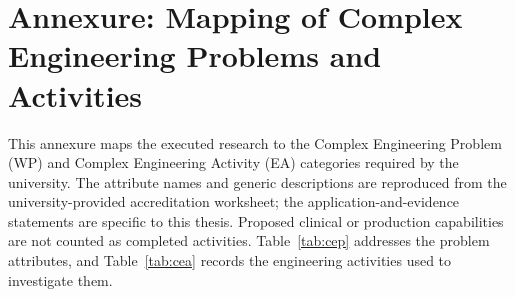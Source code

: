 \clearpage
\chapter*{Annexure: Mapping of Complex Engineering Problems and Activities}

This annexure maps the executed research to the Complex Engineering Problem (WP) and Complex Engineering Activity (EA) categories required by the university. The attribute names and generic descriptions are reproduced from the university-provided accreditation worksheet; the application-and-evidence statements are specific to this thesis. Proposed clinical or production capabilities are not counted as completed activities. Table~\ref{tab:cep} addresses the problem attributes, and Table~\ref{tab:cea} records the engineering activities used to investigate them.

\begingroup
\small
\setlength{\tabcolsep}{3pt}
\renewcommand{\arraystretch}{1.18}

